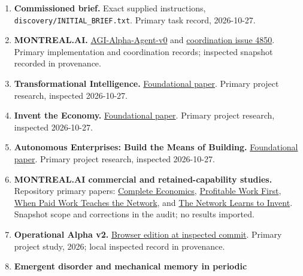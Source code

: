 \documentclass[
  11pt,
]{article}
\providecommand{\tightlist}{%
  \setlength{\itemsep}{0pt}\setlength{\parskip}{0pt}}
\begin{document}
\begin{enumerate}
\def\labelenumi{\arabic{enumi}.}
\tightlist
\item
  \textbf{Commissioned brief.} Exact supplied instructions,
  \nolinkurl{discovery/INITIAL_BRIEF.txt}. Primary task record,
  2026-10-27.
\item
  \textbf{MONTREAL.AI.}
  \href{https://github.com/MontrealAI/AGI-Alpha-Agent-v0}{AGI-Alpha-Agent-v0}
  and
  \href{https://github.com/MontrealAI/AGI-Alpha-Agent-v0/issues/4850}{coordination
  issue 4850}. Primary implementation and coordination records;
  inspected snapshot recorded in provenance.
\item
  \textbf{Transformational Intelligence.}
  \href{https://montrealai.github.io/AGI-Alpha-Agent-v0/Transformational_Intelligence.pdf}{Foundational
  paper}. Primary project research, inspected 2026-10-27.
\item
  \textbf{Invent the Economy.}
  \href{https://montrealai.github.io/AGI-Alpha-Agent-v0/Invent_the_Economy.pdf}{Foundational
  paper}. Primary project research, inspected 2026-10-27.
\item
  \textbf{Autonomous Enterprises: Build the Means of Building.}
  \href{https://montrealai.github.io/AGI-Alpha-Agent-v0/Autonomous_Enterprises.pdf}{Foundational
  paper}. Primary project research, inspected 2026-10-27.
\item
  \textbf{MONTREAL.AI commercial and retained-capability studies.}
  Repository primary papers:
  \href{https://github.com/MontrealAI/AGI-Alpha-Agent-v0/blob/main/docs/papers/agi-alpha-operational-economics-v1.pdf}{Complete
  Economics},
  \href{https://github.com/MontrealAI/AGI-Alpha-Agent-v0/blob/main/docs/papers/profitable-work-first.pdf}{Profitable
  Work First},
  \href{https://github.com/MontrealAI/AGI-Alpha-Agent-v0/blob/main/docs/papers/when-paid-work-teaches-the-network.pdf}{When
  Paid Work Teaches the Network}, and
  \href{https://github.com/MontrealAI/AGI-Alpha-Agent-v0/blob/main/docs/papers/network-learns-to-invent-v1.pdf}{The
  Network Learns to Invent}. Snapshot scope and corrections in the
  audit; no results imported.
\item
  \textbf{Operational Alpha v2.}
  \href{https://github.com/MontrealAI/AGI-Alpha-Agent-v0/blob/e5e4441aa7eb3b524edb1ba3152554baf44c8247/studies/agi-alpha-operational-alpha-v2/paper/Browser_Edition.md}{Browser
  edition at inspected commit}. Primary project study, 2026; local
  inspected record in provenance.
\item
  \textbf{Emergent disorder and mechanical memory in periodic
}
\end{enumerate}
\end{document}
